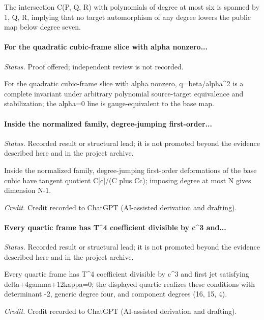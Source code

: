 The intersection C(P, Q, R) with polynomials of degree at most six is spanned by 1, Q, R, implying that no target automorphism of any degree lowers the public map below degree seven.

\label{supp-note-04-014}
\paragraph{For the quadratic cubic-frame slice with alpha nonzero...}
\emph{Status.} Proof offered; independent review is not recorded.

For the quadratic cubic-frame slice with alpha nonzero, q=beta/alpha\textasciicircum{}2 is a complete invariant under arbitrary polynomial source-target equivalence and stabilization; the alpha=0 line is gauge-equivalent to the base map.

\label{supp-note-04-015}
\paragraph{Inside the normalized family, degree-jumping first-order...}
\emph{Status.} Recorded result or structural lead; it is not promoted beyond the evidence described here and in the project archive.

Inside the normalized family, degree-jumping first-order deformations of the base cubic have tangent quotient C[c]/(C plus Cc); imposing degree at most N gives dimension N-1.

\emph{Credit.} Credit recorded to ChatGPT (AI-assisted derivation and drafting).

\label{supp-note-04-016}
\paragraph{Every quartic frame has T\textasciicircum{}4 coefficient divisible by c\textasciicircum{}3 and...}
\emph{Status.} Recorded result or structural lead; it is not promoted beyond the evidence described here and in the project archive.

Every quartic frame has T\textasciicircum{}4 coefficient divisible by c\textasciicircum{}3 and first jet satisfying delta+4gamma+12kappa=0; the displayed quartic realizes these conditions with determinant -2, generic degree four, and component degrees (16, 15, 4).

\emph{Credit.} Credit recorded to ChatGPT (AI-assisted derivation and drafting).

\label{supp-note-04-017}
